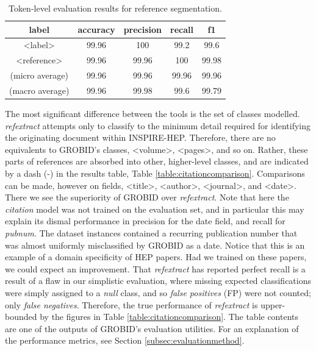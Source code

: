 \begin{table}[h]
\begin{center}
\begin{tabular}{|c|cccc|}
\hline
label           & accuracy  & precision  & recall   & f1 \\
\hline
<label>         & 99.96     & 100        & 99.2     & 99.6\\
<reference>     & 99.96     & 99.96      & 100      & 99.98\\
\hline
(micro average) & 99.96     & 99.96      & 99.96    & 99.96  \\
(macro average) & 99.96     & 99.98      & 99.6     & 99.79  \\
\hline
\end{tabular}
\caption[Token-level evaluation results for reference segmentation.]{Token-level evaluation results for reference segmentation.}
\label{table:referencesegmenterresults}
\end{center}
\end{table}

The most significant difference between the tools is the set of classes modelled. \emph{refextract} attempts only to classify to the minimum detail required for identifying the originating document within INSPIRE-HEP. Therefore, there are no equivalents to GROBID's classes, <volume>, <pages>, and so on. Rather, these parts of references are absorbed into other, higher-level classes, and are indicated by a dash (-) in the results table, Table \ref{table:citationcomparison}. Comparisons can be made, however on fields, <title>, <author>, <journal>, and <date>. There we see the superiority of GROBID over \emph{refextract}. Note that here the \emph{citation} model was not trained on the evaluation set, and in particular this may explain its dismal performance in precision for the date field, and recall for \emph{pubnum}. The dataset instances contained a recurring publication number that was almost uniformly misclassified by GROBID as a date. Notice that this is an example of a domain specificity of HEP papers. Had we trained on these papers, we could expect an improvement. That \emph{refextract} has reported perfect recall is a result of a flaw in our simplistic evaluation, where missing expected classifications were simply assigned to a \emph{null} class, and so \emph{false positives} (FP) were not counted; only \emph{false negatives}. Therefore, the true performance of \emph{refextract} is upper-bounded by the figures in Table \ref{table:citationcomparison}. The table contents are one of the outputs of GROBID's evaluation utilities. For an explanation of the performance metrics, see Section \ref{subsec:evaluationmethod}.

